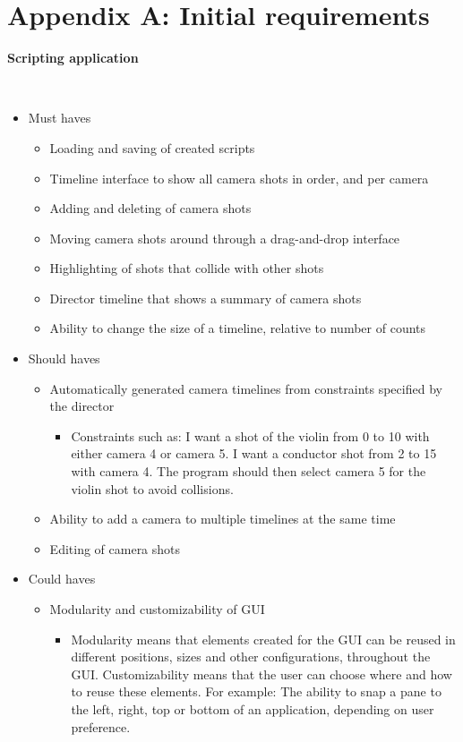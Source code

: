 \section*{Appendix A: Initial requirements}
%

\begin{large}
\textbf{Scripting application}
\end{large}\\
\begin{itemize}
\item Must haves
\begin{itemize}
\item Loading and saving of created scripts
\item Timeline interface to show all camera shots in order, and per camera
\item Adding and deleting of camera shots
\item Moving camera shots around through a drag-and-drop interface
\item Highlighting of shots that collide with other shots
\item Director timeline that shows a summary of camera shots
\item Ability to change the size of a timeline, relative to number of counts
\end{itemize}
\item Should haves
\begin{itemize}
\item Automatically generated camera timelines from constraints specified by the director
\begin{itemize}
\item Constraints such as: I want a shot of the violin from 0 to 10 with either camera 4 or camera 5. I want a conductor shot from 2 to 15 with camera 4. The program should then select camera 5 for the violin shot to avoid collisions.
\end{itemize}
\item Ability to add a camera to multiple timelines at the same time
\item Editing of camera shots
\end{itemize}
\item Could haves
\begin{itemize}
\item Modularity and customizability of GUI
\begin{itemize}
\item Modularity means that elements created for the GUI can be reused in different positions, sizes and other configurations, throughout the GUI. Customizability means that the user can choose where and how to reuse these elements. For example: The ability to snap a pane to the left, right, top or bottom of an application, depending on user preference.

\end{itemize}
\end{itemize}
\end{itemize}
